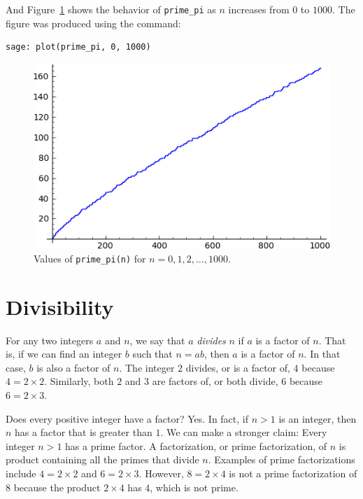 %
And Figure~\ref{fig:number_theory:prime_pi_for_n_leq_1000} shows the
behavior of \verb!prime_pi! as $n$ increases from $0$ to $1000$. The
figure was produced using the command:
%
\begin{lstlisting}
sage: plot(prime_pi, 0, 1000)
\end{lstlisting}
%
\begin{figure}[!htbp]
\centering
\includegraphics[scale=0.8]{images/prime-pi-1000}
\caption{Values of \texttt{prime\_pi(n)} for $n = 0, 1, 2, \dots, 1000$.}
\label{fig:number_theory:prime_pi_for_n_leq_1000}
\end{figure}



\section{Divisibility}

For any two integers $a$ and $n$, we say that $a$ \emph{divides} $n$
if $a$ is a factor of $n$. That is, if we can find an integer $b$ such
that $n = ab$, then $a$ is a factor of $n$. In that case, $b$ is also
a factor of $n$. The integer $2$ divides, or is a factor of, $4$
because $4 = 2 \times 2$. Similarly, both $2$ and $3$ are factors of,
or both divide, $6$ because $6 = 2 \times 3$.

Does every positive integer have a factor? Yes. In fact, if $n > 1$ is
an integer, then $n$ has a factor that is greater than $1$. We can
make a stronger claim: Every integer $n > 1$ has a prime factor. A
factorization, or prime factorization, of $n$ is product containing
all the primes that divide $n$. Examples of prime factorizations
include $4 = 2 \times 2$ and $6 = 2 \times 3$. However, $8 = 2 \times 4$
is not a prime factorization of $8$ because the product $2 \times 4$
has $4$, which is not prime.

